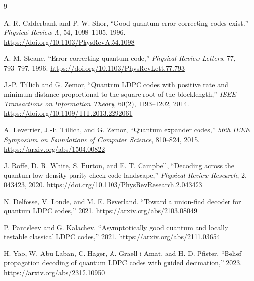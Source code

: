 \documentclass[11pt,letterpaper]{article}
\begin{document}
\clearpage
\begin{thebibliography}{9}

A. R. Calderbank and P. W. Shor,
``Good quantum error-correcting codes exist,''
\emph{Physical Review A}, 54, 1098--1105, 1996.
\url{https://doi.org/10.1103/PhysRevA.54.1098}

A. M. Steane,
``Error correcting quantum code,''
\emph{Physical Review Letters}, 77, 793--797, 1996.
\url{https://doi.org/10.1103/PhysRevLett.77.793}

J.-P. Tillich and G. Zemor,
``Quantum LDPC codes with positive rate and minimum distance proportional to the square root of the blocklength,''
\emph{IEEE Transactions on Information Theory}, 60(2), 1193--1202, 2014.
\url{https://doi.org/10.1109/TIT.2013.2292061}

A. Leverrier, J.-P. Tillich, and G. Zemor,
``Quantum expander codes,''
\emph{56th IEEE Symposium on Foundations of Computer Science}, 810--824, 2015.
\url{https://arxiv.org/abs/1504.00822}

J. Roffe, D. R. White, S. Burton, and E. T. Campbell,
``Decoding across the quantum low-density parity-check code landscape,''
\emph{Physical Review Research}, 2, 043423, 2020.
\url{https://doi.org/10.1103/PhysRevResearch.2.043423}

N. Delfosse, V. Londe, and M. E. Beverland,
``Toward a union-find decoder for quantum LDPC codes,'' 2021.
\url{https://arxiv.org/abs/2103.08049}

P. Panteleev and G. Kalachev,
``Asymptotically good quantum and locally testable classical LDPC codes,'' 2021.
\url{https://arxiv.org/abs/2111.03654}

H. Yao, W. Abu Laban, C. Hager, A. Graell i Amat, and H. D. Pfister,
``Belief propagation decoding of quantum LDPC codes with guided decimation,'' 2023.
\url{https://arxiv.org/abs/2312.10950}

\end{thebibliography}
\end{document}
